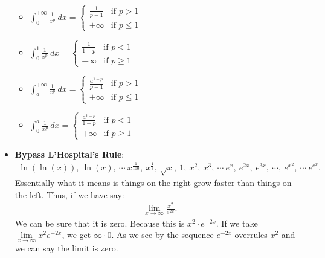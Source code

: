 \documentclass{report}
\begin{document}
\begin{itemize}
\begin{itemize}
                \item $\int_{0}^{+\infty} \frac{1}{x^{p}}\ dx =  
                    \begin{cases}
                        \frac{1}{p-1} & \text{if } p>1 \\
                        +\infty & \text{if } p \leq 1
                    \end{cases}$
                \item $\int_{0}^{1} \frac{1}{x^p}\ dx =    
                    \begin{cases}
                        \frac{1}{1-p} & \text{if } p<1 \\
                        +\infty & \text{if } p \geq 1
                    \end{cases}$
                \item $\int_{a}^{+\infty} \frac{1}{x^{p}}\ dx =  
                    \begin{cases}
                        \frac{a^{1-p}}{p-1} & \text{if } p>1 \\
                        +\infty & \text{if } p \leq 1
                    \end{cases}$
                \item $\int_{0}^{a} \frac{1}{x^p}\ dx =    
                    \begin{cases}
                        \frac{a^{1-p}}{1-p} & \text{if } p<1 \\
                        +\infty & \text{if } p \geq 1
                    \end{cases}$
            \end{itemize}
        \item \textbf{Bypass L'Hospital's Rule}:
            \begin{align*}
                \ln{(\ln{(x)})},\ \ln{(x)},\ \cdots\ x^{\frac{1}{100}},\ x^{\frac{1}{3}},\ \sqrt{x},\ 1,\ x^{2},\ x^{3},\ \cdots\ e^{x},\ e^{2x},\ e^{3x},\ \cdots,\ e^{x^{2}},\ \cdots\ e^{e^{x}}
            .\end{align*}
            Essentially what it means is things on the right grow faster than things on the left. Thus, if we have say:
            \begin{align*}
                \lim\limits_{x \to \infty}{\frac{x^{2}}{e^{2x}}} 
            .\end{align*}
            We can be sure that it is zero. Because this is $x^{2}\cdot e^{-2x}$. If we take  $ \lim\limits_{x \to \infty}{x^{2}e^{-2x}}$, we get $\infty \cdot 0$. As we see by the sequence $e^{-2x}$ overrules $x^{2}$ and we can say the limit is zero.

\end{itemize}
\end{document}
